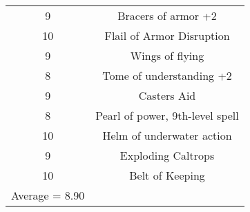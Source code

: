 \documentclass[letterpaper, 10pt]{article}
\begin{document}
\begin{center}
\begin{tabular}{|| c c ||}
    9  & Bracers of armor +2\\
    10 & Flail of Armor Disruption\\
    9  & Wings of flying\\
    8  & Tome of understanding +2\\
    9  & Casters Aid\\
    8  & Pearl of power, 9th-level spell\\
    10 & Helm of underwater action\\
    9  & Exploding Caltrops\\
    10 & Belt of Keeping \\
    \hline
    Average = 8.90 & \\
    \hline
    \hline
    \end{tabular}
\end{center}
\newpage
\end{document}
